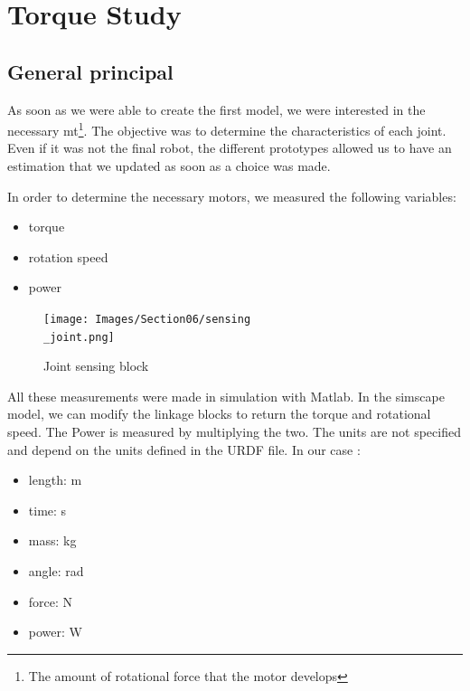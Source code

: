 \section{Torque Study}\insertloftspace
\setcounter{figure}{0}\setcounter{table}{0}

\subsection{General principal}

As soon as we were able to create the first model, we were interested in the necessary \gls{mt}\footnote{The amount of rotational force that the motor develops}. The objective was to determine the characteristics of each joint. Even if it was not the final robot, the different prototypes allowed us to have an estimation that we updated as soon as a choice was made. 

\bigbreak
In order to determine the necessary motors, we measured the following variables:
\begin{multicols}{3}
    \begin{itemize}[noitemsep]
        \item torque
        \item rotation speed
        \item power
    \end{itemize}
\end{multicols}

\bigbreak
\begin{figure}[ht]
    \centering
    \texttt{[image: Images/Section06/sensing\\\_joint.png]}
    \caption{Joint sensing block}
    \label{fig:SensingBlock}
\end{figure}
\FloatBarrier

\bigbreak
All these measurements were made in simulation with Matlab. In the simscape model, we can modify the linkage blocks to return the torque and rotational speed. The Power is measured by multiplying the two. The units are not specified and depend on the units defined in the URDF file. In our case : 
\begin{multicols}{2}
    \begin{itemize}[noitemsep]
        \item length: m
        \item time: s
        \item mass: kg
        \item angle: rad
        \item force: N
        \item power: W
    \end{itemize}
\end{multicols}

